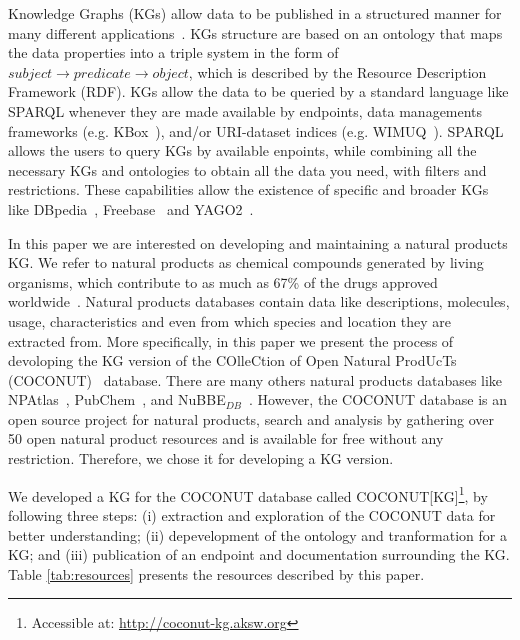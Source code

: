 \documentclass[
]{ceurart}
\begin{document}
Knowledge Graphs (KGs) allow data to be published in a structured manner for many different applications~\cite{hogan2021knowledge}.
KGs structure are based on an ontology that maps the data properties into a triple system in the form of $subject \rightarrow predicate \rightarrow object$, which is described by the Resource Description Framework (RDF).
KGs allow the data to be queried by a standard language like SPARQL whenever they are made available by endpoints, data managements frameworks (e.g. KBox~\cite{marx2017kbox}), and/or URI-dataset indices (e.g. WIMUQ~\cite{valdestilhas2019more}).
SPARQL allows the users to query KGs by available enpoints, while combining all the necessary KGs and ontologies to obtain all the data you need, with filters and restrictions.
These capabilities allow the existence of specific and broader KGs like DBpedia~\cite{lehmann2015dbpedia}, Freebase~\cite{bollacker2008freebase} and YAGO2~\cite{hoffart2013yago2}.

In this paper we are interested on developing and maintaining a natural products KG.
We refer to natural products as chemical compounds generated by living organisms, which contribute to as much as 67\% of the drugs approved worldwide~\cite{newman2016natural}.
Natural products databases contain data like descriptions, molecules, usage, characteristics and even from which species and location they are extracted from.
More specifically, in this paper we present the process of devoloping the KG version of the COlleCtion of Open Natural ProdUcTs (COCONUT)~\cite{sorokina2021coconut} database.
There are many others natural products databases like NPAtlas~\cite{van2019natural,van2022natural}, PubChem~\cite{kim2023pubchem}, and NuBBE$_{DB}$~\cite{valli2013development,pilon2017nubbedb}.
However, the COCONUT database is an open source project for natural products, search and analysis by gathering over 50 open natural product resources and is available for free without any restriction.
Therefore, we chose it for developing a KG version.

We developed a KG for the COCONUT database called COCONUT[KG]\footnote{Accessible at: \url{http://coconut-kg.aksw.org}}, by following three steps: (i) extraction and exploration of the COCONUT data for better understanding; (ii) depevelopment of the ontology and tranformation for a KG; and (iii) publication of an endpoint and documentation surrounding the KG.
Table \ref{tab:resources} presents the resources described by this paper.
\end{document}
